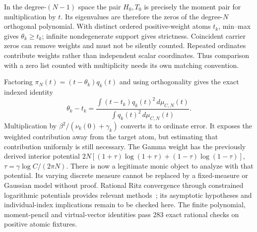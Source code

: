 In the degree-$(N-1)$ space the pair $H_0,T_0$ is precisely the moment
pair for multiplication by $t$. Its eigenvalues are therefore the
zeros of the degree-$N$ orthogonal polynomial. With distinct ordered
positive-weight atoms $t_k$, min--max gives $\theta_k\ge t_k$;
infinite nondegenerate support gives strictness. Coincident carrier
zeros can remove weights and must not be silently counted. Repeated
ordinates contribute weights rather than independent scalar coordinates.
Thus comparison with a zero list counted with multiplicity needs its
own matching convention.

Factoring $\pi_N(t)=(t-\theta_k)q_k(t)$ and using orthogonality gives
the exact indexed identity
\[
 \theta_k-t_k=
 \frac{\int(t-t_k)q_k(t)^2\,d\mu_{C,N}(t)}
      {\int q_k(t)^2\,d\mu_{C,N}(t)}.
\]
Multiplication by $\beta^2/(\nu_k(0)+\gamma_k)$ converts it to ordinate
error. It exposes the weighted contribution away from the target atom,
but estimating that contribution uniformly is still necessary.
The Gamma weight has the previously derived interior potential
$2N[(1+\tau)\log(1+\tau)+(1-\tau)\log(1-\tau)]$,
$\tau=\gamma\log C/(2\pi N)$. There is now a legitimate monic
object to analyze with that potential. Its varying discrete measure
cannot be replaced by a fixed-measure or Gaussian model without proof.
Rational Ritz convergence through constrained logarithmic potentials
provides relevant methods~\cite{BGV2010}; its asymptotic hypotheses
and individual-index implications remain to be checked here.
The finite polynomial, moment-pencil and virtual-vector identities
pass 283 exact rational checks on positive atomic fixtures.

